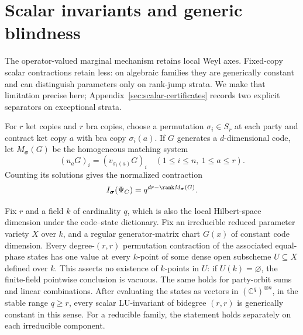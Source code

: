 \section{Scalar invariants and generic blindness}\label{sec:invariants}

The operator-valued marginal mechanism retains local Weyl axes.  Fixed-copy
scalar contractions retain less: on algebraic families they are generically
constant and can distinguish parameters only on rank-jump strata.  We make
that limitation precise here; Appendix~\ref{sec:scalar-certificates}
records two explicit separators on exceptional strata.

For \(r\) ket copies and \(r\) bra copies, choose a permutation
\(\sigma_i\in S_r\) at each party and contract ket copy \(a\) with bra
copy \(\sigma_i(a)\).  If \(G\) generates a \(d\)-dimensional code, let
\(M_{\boldsymbol\sigma}(G)\) be the homogeneous matching system
\[
 (u_aG)_i=(v_{\sigma_i(a)}G)_i
 \quad(1\leq i\leq n,\ 1\leq a\leq r).
\]
Counting its solutions gives the normalized contraction
\begin{equation}\label{eq:permutation-contraction}
 I_{\boldsymbol\sigma}(\Psi_C)
   =q^{dr-\rank M_{\boldsymbol\sigma}(G)}.
\end{equation}

\begin{proposition}\label{thm:fixed-copy-boundary}
Fix \(r\) and a field \(k\) of cardinality \(q\), which is also the local
Hilbert-space dimension under the code--state dictionary.  Fix an
irreducible reduced parameter variety \(X\) over \(k\), and a regular
generator-matrix chart \(G(x)\) of constant code dimension.  Every
degree-\((r,r)\) permutation contraction of the associated equal-phase
states has one value at every \(k\)-point of some dense open subscheme
\(U\subseteq X\) defined over \(k\).  This asserts no existence of
\(k\)-points in \(U\): if \(U(k)=\varnothing\), the finite-field
pointwise conclusion is vacuous.  The same holds for party-orbit sums and
linear combinations.  After evaluating the states as vectors in
\((\mathbb C^q)^{\otimes n}\), in the stable range \(q\geq r\), every
scalar LU-invariant of bidegree \((r,r)\) is generically constant in this
sense.  For a reducible family, the statement holds separately on each
irreducible component.
\end{proposition}

